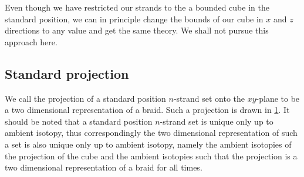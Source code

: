 \begin{remark}
	Even though we have restricted our strands to the a bounded cube in the standard position, we can in principle change the bounds of our cube in \(x\) and \(z\) directions to any value and get the same theory. We shall not pursue this approach here.
\end{remark}

\subsection{Standard projection}

We call the projection of a standard position \(n\)-strand set onto the \(xy\)-plane to be a two dimensional representation of a braid. Such a projection is drawn in \cref{fig:2drepbraids}. It should be noted that a standard position \(n\)-strand set is unique only up to ambient isotopy, thus correspondingly the two dimensional representation of such a set is also unique only up to ambient isotopy, namely the ambient isotopies of the projection of the cube and the ambient isotopies such that the projection is a two dimensional representation of a braid for all times.

\begin{figure}
	\centering
	\label{fig:2drepbraids}
\end{figure}

